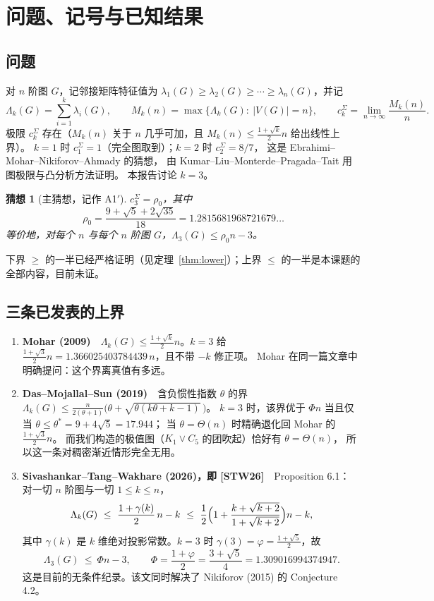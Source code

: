\documentclass[UTF8,11pt]{ctexart}
\newtheorem{conjecture}[theorem]{猜想}
\theoremstyle{definition}
\newcommand{\Lam}{\Lambda}
\newcommand{\STW}{\textup{[STW26]}}
\begin{document}
\tableofcontents
\newpage

\section{问题、记号与已知结果}

\subsection{问题}

对 $n$ 阶图 $G$，记邻接矩阵特征值为 $\lambda_1(G)\ge\lambda_2(G)\ge\cdots\ge\lambda_n(G)$，并记
\[
\Lam_k(G)=\sum_{i=1}^k\lambda_i(G),\qquad
M_k(n)=\max\{\Lam_k(G):\ |V(G)|=n\},\qquad
c_k^{\Sigma}=\lim_{n\to\infty}\frac{M_k(n)}{n}.
\]
极限 $c_k^{\Sigma}$ 存在（$M_k(n)$ 关于 $n$ 几乎可加，且 $M_k(n)\le \frac{1+\sqrt k}{2}n$ 给出线性上界）。
$k=1$ 时 $c_1^{\Sigma}=1$（完全图取到）；$k=2$ 时 $c_2^{\Sigma}=8/7$，
这是 Ebrahimi--Mohar--Nikiforov--Ahmady 的猜想，
由 Kumar--Liu--Monterde--Pragada--Tait 用图极限与凸分析方法证明。
本报告讨论 $k=3$。

\begin{conjecture}[主猜想，记作 A1$'$]\label{conj:A1}
$c_3^{\Sigma}=\rho_0$，其中
\[
\rho_0=\frac{9+\sqrt5+2\sqrt{35}}{18}=1.2815681968721679\ldots
\]
等价地，对每个 $n$ 与每个 $n$ 阶图 $G$，$\Lam_3(G)\le\rho_0 n-3$。
\end{conjecture}

下界 $\ge$ 的一半已经严格证明（见定理~\ref{thm:lower}）；上界 $\le$ 的一半是本课题的全部内容，目前未证。

\subsection{三条已发表的上界}

\begin{enumerate}[leftmargin=1.6em,itemsep=2pt]
\item \textbf{Mohar (2009)}\ \ $\Lam_k(G)\le\frac{1+\sqrt k}{2}n$。$k=3$ 给
$\frac{1+\sqrt3}{2}n=1.366025403784439\,n$，且不带 $-k$ 修正项。
Mohar 在同一篇文章中明确提问：这个界离真值有多远。
\item \textbf{Das--Mojallal--Sun (2019)}\ \ 含负惯性指数 $\theta$ 的界
$\Lam_k(G)\le\frac{n}{2(\theta+1)}\bigl(\theta+\sqrt{\theta(k\theta+k-1)}\,\bigr)$。
$k=3$ 时，该界优于 $\Phi n$ 当且仅当 $\theta\le\theta^*=9+4\sqrt5=17.944$；
当 $\theta=\Theta(n)$ 时精确退化回 Mohar 的 $\frac{1+\sqrt3}{2}n$。
而我们构造的极值图（$K_1\vee C_5$ 的团吹起）恰好有 $\theta=\Theta(n)$，
所以这一条对稠密渐近情形完全无用。
\item \textbf{Sivashankar--Tang--Wakhare (2026)，即 \STW}\ \ Proposition 6.1：
对一切 $n$ 阶图与一切 $1\le k\le n$，
\[
\Lam_k(G)\ \le\ \frac{1+\gamma(k)}{2}\,n-k
\ \le\ \frac12\Bigl(1+\frac{k+\sqrt{k+2}}{1+\sqrt{k+2}}\Bigr)n-k ,
\]
其中 $\gamma(k)$ 是 $k$ 维绝对投影常数。$k=3$ 时 $\gamma(3)=\varphi=\frac{1+\sqrt5}{2}$，故
\[
\Lam_3(G)\ \le\ \Phi n-3,\qquad \Phi=\frac{1+\varphi}{2}=\frac{3+\sqrt5}{4}=1.309016994374947 .
\]
这是目前的无条件纪录。该文同时解决了 Nikiforov (2015) 的 Conjecture 4.2。
\end{enumerate}
\end{document}

